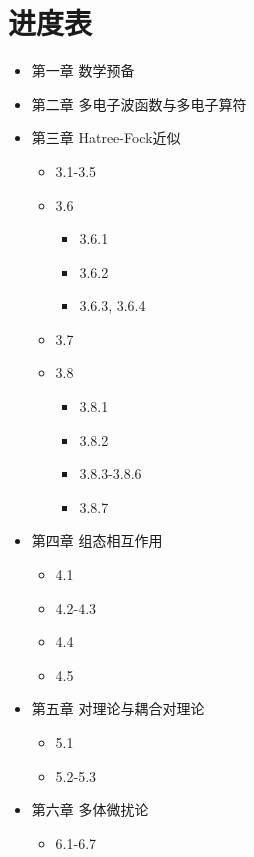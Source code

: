\chapter*{进度表}
\begin{itemize}
    \item[\Square] 第一章 数学预备
    \item[\CheckedBox] 第二章 多电子波函数与多电子算符
    \item[\DSquare] 第三章 Hatree-Fock近似 \begin{itemize}
        \item[\CheckedBox] 3.1-3.5
        \item[\DSquare] 3.6 \begin{itemize}
            \item[\CheckedBox] 3.6.1 
            \item[\DSquare] 3.6.2
            \item[\Square] 3.6.3, 3.6.4
        \end{itemize}
        \item[\Square] 3.7
        \item[\DSquare] 3.8 \begin{itemize}
            \item[\CheckedBox] 3.8.1
            \item[\DSquare] 3.8.2
            \item[\Square] 3.8.3-3.8.6
            \item[\DSquare] 3.8.7
        \end{itemize}
    \end{itemize}
    \item[\DSquare] 第四章 组态相互作用 \begin{itemize}
        \item[\DSquare] 4.1
        \item[\Square] 4.2-4.3
        \item[\CheckedBox] 4.4
        \item[\DSquare] 4.5
    \end{itemize}
    \item[\DSquare] 第五章 对理论与耦合对理论 \begin{itemize}
        \item[\DSquare] 5.1
        \item[\Square] 5.2-5.3
    \end{itemize}
    \item[\DSquare] 第六章 多体微扰论 \begin{itemize}
        \item[\CheckedBox] 6.1-6.7

\end{itemize}
\end{itemize}
